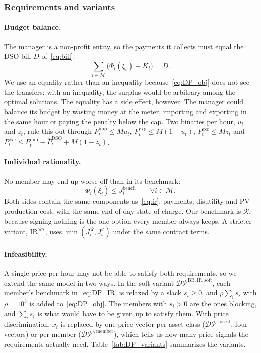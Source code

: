 \subsubsection{Requirements and variants}
\paragraph{Budget balance.}
The manager is a non-profit entity, so the payments it collects must equal the DSO bill $D$ of~\eqref{eq:bill}:
\begin{equation}\label{eq:DP_BB}
\sum_{i\in\mathcal{M}}\big(\Phi_i(\xi_i)-K_i\big)=D .
\end{equation}
We use an equality rather than an inequality because~\eqref{eq:DP_obj} does not see the transfers: with an inequality, the surplus would be arbitrary among the optimal solutions.
The equality has a side effect, however.
The manager could balance its budget by wasting money at the meter, importing and exporting in the same hour or paying the penalty below the cap.
Two binaries per hour, $u_t$ and $z_t$, rule this out through $P^{\mathrm{imp}}_t\leq Mu_t$, $P^{\mathrm{exp}}_t\leq M(1-u_t)$, $P^{\mathrm{exc}}_t\leq Mz_t$ and $P^{\mathrm{exc}}_t\leq P^{\mathrm{imp}}_t-\overline{P}^{\mathrm{DSO}}_t+M(1-z_t)$.

\paragraph{Individual rationality.}
No member may end up worse off than in its benchmark:
\begin{equation}\label{eq:DP_IR}
\Phi_i(\xi_i)\leq J^{\mathrm{bench}}_i \qquad \forall i\in\mathcal{M}.
\end{equation}
Both sides contain the same components as~\eqref{eq:ir}: payments, disutility and PV production cost, with the same end-of-day state of charge.
Our benchmark is $\mathcal{R}$, because signing nothing is the one option every member always keeps.
A stricter variant, $\mathrm{IR}^{\mathcal{RI}}$, uses $\min(J^{\mathcal{R}}_i,J^{\mathcal{I}}_i)$ under the same contract terms.

\paragraph{Infeasibility.}
A single price per hour may not be able to satisfy both requirements, so we extend the same model in two ways.
In the soft variant $\mathcal{DP}^{\mathrm{BB,IR,soft}}$, each member's benchmark in~\eqref{eq:DP_IR} is relaxed by a slack $s_i\geq0$, and $\rho\sum_is_i$ with $\rho=10^3$ is added to~\eqref{eq:DP_obj}.
The members with $s_i>0$ are the ones blocking, and $\sum_is_i$ is what would have to be given up to satisfy them.
With price discrimination, $x_t$ is replaced by one price vector per asset class ($\mathcal{DP}^{\cdot,\mathrm{asset}}$, four vectors) or per member ($\mathcal{DP}^{\cdot,\mathrm{member}}$), which tells us how many price signals the requirements actually need.
Table~\ref{tab:DP_variants} summarizes the variants.

